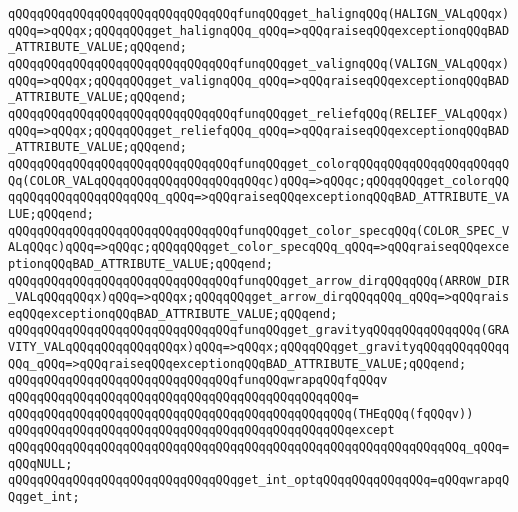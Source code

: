 \verb|qQQqqQQqqQQqqQQqqQQqqQQqqQQqqQQqfunqQQqget_halignqQQq(HALIGN_VALqQQqx)qQQq=>qQQqx;qQQqqQQqget_halignqQQq_qQQq=>qQQqraiseqQQqexceptionqQQqBAD_ATTRIBUTE_VALUE;qQQqend;|\newline
\verb|qQQqqQQqqQQqqQQqqQQqqQQqqQQqqQQqfunqQQqget_valignqQQq(VALIGN_VALqQQqx)qQQq=>qQQqx;qQQqqQQqget_valignqQQq_qQQq=>qQQqraiseqQQqexceptionqQQqBAD_ATTRIBUTE_VALUE;qQQqend;|\newline
\newline
\verb|qQQqqQQqqQQqqQQqqQQqqQQqqQQqqQQqfunqQQqget_reliefqQQq(RELIEF_VALqQQqx)qQQq=>qQQqx;qQQqqQQqget_reliefqQQq_qQQq=>qQQqraiseqQQqexceptionqQQqBAD_ATTRIBUTE_VALUE;qQQqend;|\newline
\newline
\verb|qQQqqQQqqQQqqQQqqQQqqQQqqQQqqQQqfunqQQqget_colorqQQqqQQqqQQqqQQqqQQqqQQq(COLOR_VALqQQqqQQqqQQqqQQqqQQqqQQqc)qQQq=>qQQqc;qQQqqQQqget_colorqQQqqQQqqQQqqQQqqQQqqQQq_qQQq=>qQQqraiseqQQqexceptionqQQqBAD_ATTRIBUTE_VALUE;qQQqend;|\newline
\verb|qQQqqQQqqQQqqQQqqQQqqQQqqQQqqQQqfunqQQqget_color_specqQQq(COLOR_SPEC_VALqQQqc)qQQq=>qQQqc;qQQqqQQqget_color_specqQQq_qQQq=>qQQqraiseqQQqexceptionqQQqBAD_ATTRIBUTE_VALUE;qQQqend;|\newline
\newline
\verb|qQQqqQQqqQQqqQQqqQQqqQQqqQQqqQQqfunqQQqget_arrow_dirqQQqqQQq(ARROW_DIR_VALqQQqqQQqx)qQQq=>qQQqx;qQQqqQQqget_arrow_dirqQQqqQQq_qQQq=>qQQqraiseqQQqexceptionqQQqBAD_ATTRIBUTE_VALUE;qQQqend;|\newline
\verb|qQQqqQQqqQQqqQQqqQQqqQQqqQQqqQQqfunqQQqget_gravityqQQqqQQqqQQqqQQq(GRAVITY_VALqQQqqQQqqQQqqQQqx)qQQq=>qQQqx;qQQqqQQqget_gravityqQQqqQQqqQQqqQQq_qQQq=>qQQqraiseqQQqexceptionqQQqBAD_ATTRIBUTE_VALUE;qQQqend;|\newline
\newline
\verb|qQQqqQQqqQQqqQQqqQQqqQQqqQQqqQQqfunqQQqwrapqQQqfqQQqv|\newline
\verb|qQQqqQQqqQQqqQQqqQQqqQQqqQQqqQQqqQQqqQQqqQQqqQQq=|\newline
\verb|qQQqqQQqqQQqqQQqqQQqqQQqqQQqqQQqqQQqqQQqqQQqqQQq(THEqQQq(fqQQqv))|\newline
\verb|qQQqqQQqqQQqqQQqqQQqqQQqqQQqqQQqqQQqqQQqqQQqqQQqexcept|\newline
\verb|qQQqqQQqqQQqqQQqqQQqqQQqqQQqqQQqqQQqqQQqqQQqqQQqqQQqqQQqqQQqqQQq_qQQq=qQQqNULL;|\newline
\newline
\verb|qQQqqQQqqQQqqQQqqQQqqQQqqQQqqQQqget_int_optqQQqqQQqqQQqqQQq=qQQqwrapqQQqget_int;|\newline
